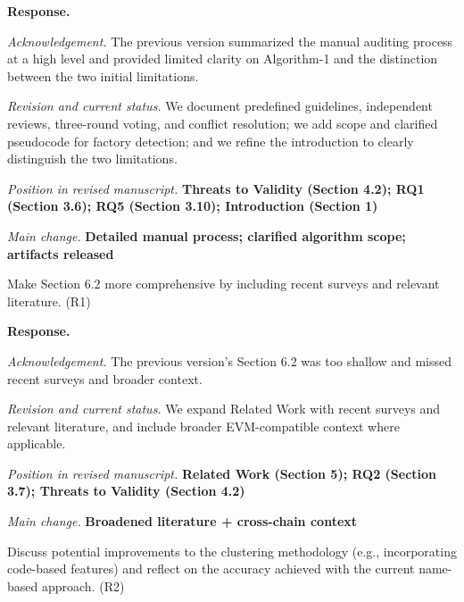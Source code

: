 \documentclass[acmsmall]{acmart}
\begin{document}
	\noindent
	\textbf{Response.}

	\textit{Acknowledgement.} The previous version summarized the manual auditing process at a high
	level and provided limited clarity on Algorithm-1 and the distinction between the two initial
	limitations.

	\textit{Revision and current status.} We document predefined guidelines, independent reviews, three-round
	voting, and conflict resolution; we add scope and clarified pseudocode for factory detection;
	and we refine the introduction to clearly distinguish the two limitations.

	\vspace{0.25em}
	\textit{Position in revised manuscript.} {\color{red}\textbf{Threats to Validity (Section 4.2); RQ1 (Section 3.6); RQ5 (Section 3.10); Introduction (Section 1)}}

	\textit{Main change.} {\color{blue}\textbf{Detailed manual process; clarified algorithm scope; artifacts released}}

	\begin{tcolorbox}
		[commentbox,title=Editor/AE -- Comment 6] Make Section 6.2 more comprehensive by including
		recent surveys and relevant literature. (R1)
	\end{tcolorbox}

	\noindent
	\textbf{Response.}

	\textit{Acknowledgement.} The previous version’s Section 6.2 was too shallow and missed recent
	surveys and broader context.

	\textit{Revision and current status.} We expand Related Work with recent surveys and relevant literature,
	and include broader EVM-compatible context where applicable.

	\vspace{0.25em}
	\textit{Position in revised manuscript.} {\color{red}\textbf{Related Work (Section 5); RQ2 (Section 3.7); Threats to Validity (Section 4.2)}}

	\textit{Main change.} {\color{blue}\textbf{Broadened literature + cross-chain context}}

	\begin{tcolorbox}
		[commentbox,title=Editor/AE -- Comment 7.1] Discuss potential improvements to the clustering
		methodology (e.g., incorporating code-based features) and reflect on the accuracy achieved
		with the current name-based approach. (R2)
	\end{tcolorbox}
\end{document}
